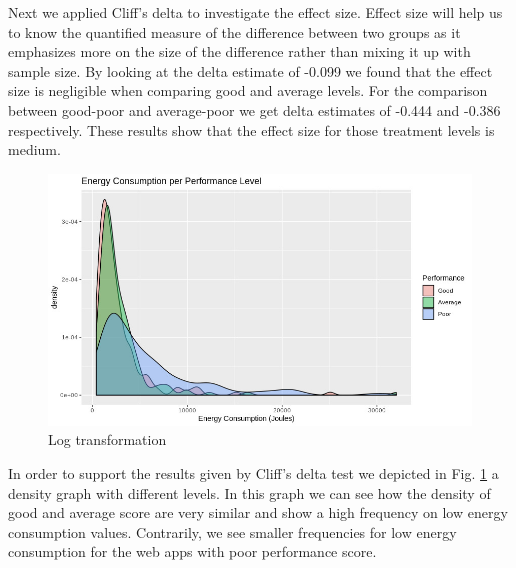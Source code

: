 Next we applied Cliff's delta to investigate the effect size. Effect size will help us to know the quantified measure of the difference between two groups as it emphasizes more on the size of the difference rather than mixing it up with sample size. By looking at the delta estimate of -0.099  we found that the effect size is negligible when comparing good and average levels. For the comparison between good-poor and average-poor we get delta estimates of -0.444 and -0.386 respectively. These results show that the effect size for those treatment levels is medium.

\begin{figure}[H]
  \includegraphics[width=\linewidth]{./Images/density-performance-levels.png}
  \caption{Log transformation}
  \label{fig:density-levels}
\end{figure}

In order to support the results given by Cliff's delta test we depicted in Fig. \ref{fig:density-levels} a density graph with different levels. In this graph we can see how the density of good and average score are very similar and show a high frequency on low energy consumption values. Contrarily, we see smaller frequencies for low energy consumption for the web apps with poor performance score.




